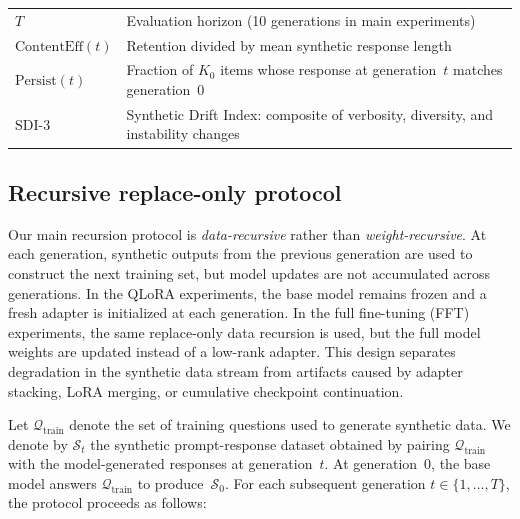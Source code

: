 \documentclass[a4paper,fleqn]{cas-dc}
\newif\ifshowchanges
\newcommand{\rev}[1]{\ifshowchanges{\color{blue}#1}\else{#1}\fi}
\begin{document}
{\begin{table}[h]
\begin{tabular*}{\columnwidth}{@{\extracolsep{\fill}}ll}
$T$            & Evaluation horizon (10 generations in main experiments) \\
$\mathrm{ContentEff}(t)$ & Retention divided by mean synthetic response length \\
$\mathrm{Persist}(t)$    & Fraction of $K_0$ items whose response at generation~$t$
                           matches generation~0 \\
$\mathrm{SDI\text{-}3}$  & Synthetic Drift Index: composite of verbosity, diversity,
                           and instability changes \\
\bottomrule
\end{tabular*}
\end{table}
}%

\subsection{Recursive replace-only protocol}\label{sec:protocol}

Our main recursion protocol is \textit{data-recursive} rather than
\textit{weight-recursive}. At each generation, synthetic outputs from the
previous generation are used to construct the next training set, but model
updates are not accumulated across generations. In the QLoRA experiments, the base model remains
frozen and a fresh adapter is initialized at each generation. In the full
fine-tuning (FFT) experiments, the same replace-only data recursion is used, but
the full model weights are updated instead of a low-rank adapter. This design
separates degradation in the synthetic data stream from artifacts caused by
adapter stacking, LoRA merging, or cumulative checkpoint continuation.

Let $\mathcal{Q}_{\mathrm{train}}$ denote the set of training questions used to
generate synthetic data. We denote by $\mathcal{S}_t$ the synthetic
prompt-response dataset obtained by pairing
$\mathcal{Q}_{\mathrm{train}}$ with the model-generated responses at
generation~$t$. At generation~0, the base model answers
$\mathcal{Q}_{\mathrm{train}}$ to produce~$\mathcal{S}_0$. For each subsequent
generation $t \in \{1,\ldots,T\}$, the protocol proceeds as follows:
\end{document}
